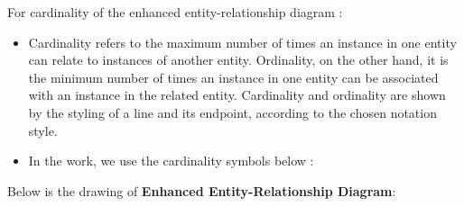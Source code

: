 \documentclass[a4paper]{article}
\begin{document}
For cardinality of the enhanced entity-relationship diagram :
\begin{itemize}
    \item Cardinality refers to the maximum number of times an instance in one entity can relate to instances of another entity. Ordinality, on the other hand, it is the minimum number of times an instance in one entity can be associated with an instance in the related entity. Cardinality and ordinality are shown by the styling of a line and its endpoint, according to the chosen notation style.
    \item In the work, we use the cardinality symbols below :
    \begin{figure}[!ht]
        \centering
    \end{figure}
\end{itemize}
\newpage

Below is the drawing of \textbf{Enhanced Entity-Relationship Diagram}:
\begin{figure}[!ht]
    \centering
\end{figure}
\end{document}
